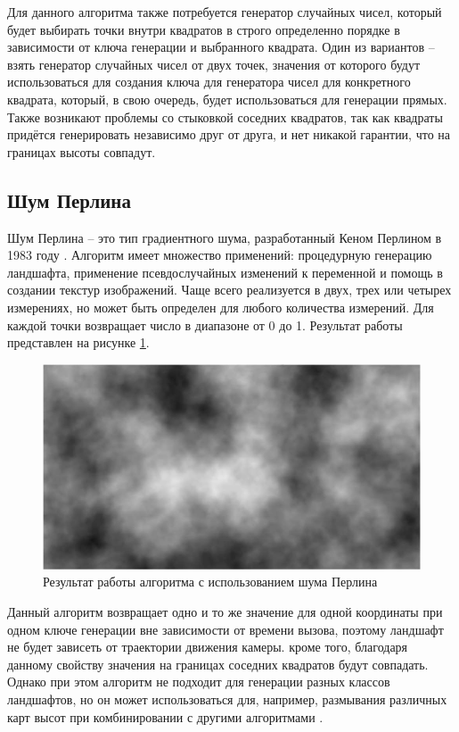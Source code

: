 Для данного алгоритма также потребуется генератор случайных чисел, который будет выбирать точки внутри квадратов в строго определенно порядке в зависимости от ключа генерации и выбранного квадрата. Один из вариантов -- взять генератор случайных чисел от двух точек, значения от которого будут использоваться для создания ключа для генератора чисел для конкретного квадрата, который, в свою очередь, будет использоваться для генерации прямых. Также возникают проблемы со стыковкой соседних квадратов, так как квадраты придётся генерировать независимо друг от друга, и нет никакой гарантии, что на границах высоты совпадут.

\subsection{Шум Перлина}

Шум Перлина -- это тип градиентного шума, разработанный Кеном Перлином в 1983 году \cite{perlin}. Алгоритм имеет множество применений: процедурную генерацию ландшафта, применение псевдослучайных изменений к переменной и помощь в создании текстур изображений. Чаще всего реализуется в двух, трех или четырех измерениях, но может быть определен для любого количества измерений. Для каждой точки возвращает число в диапазоне от 0 до 1. Результат работы представлен на рисунке \ref{fig:perlin}.

\begin{figure}[h!]
	\centering
	\includegraphics[width=1\textwidth]{tex_parts/perlin.png}
	\caption{\label{fig:perlin}Результат работы алгоритма с использованием шума Перлина \cite{perlin}}
\end{figure}

Данный алгоритм возвращает одно и то же значение для одной координаты при одном ключе генерации вне зависимости от времени вызова, поэтому ландшафт не будет зависеть от траектории движения камеры. кроме того, благодаря данному свойству значения на границах соседних квадратов будут совпадать. Однако при этом алгоритм не подходит для генерации разных классов ландшафтов, но он может использоваться для, например, размывания различных карт высот при комбинировании с другими алгоритмами \cite{landscapes}.

